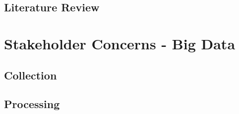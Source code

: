 \documentclass[12pt]{article} %
\begin{document}
		
		\subsection{Literature Review}
	
	
	
	
	
	
	
	\section{Stakeholder Concerns - Big Data}
	
	
	
	\subsection{Collection}
	
	
	
	
	\subsection{Processing}
	
\end{document}
